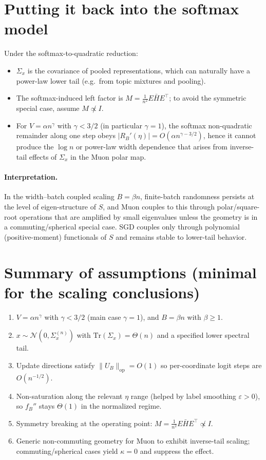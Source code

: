 \documentclass[11pt]{article}
\begin{document}
\section{Putting it back into the softmax model}

Under the softmax-to-quadratic reduction:
\begin{itemize}
\item $\Sigma_x$ is the covariance of pooled representations, which can naturally have a power-law lower tail (e.g.\ from topic mixtures and pooling).
\item The softmax-induced left factor is $M=\tfrac1{n^2}E\bar H E^\top$; to avoid the symmetric special case, assume $M\not\propto I$.
\item For $V=\alpha n^\gamma$ with $\gamma<3/2$ (in particular $\gamma=1$), the softmax non-quadratic remainder along one step obeys
$|R_B'(\eta)|=O(\alpha n^{\gamma-3/2})$, hence it cannot produce the $\log n$ or power-law width dependence that arises from inverse-tail
effects of $\Sigma_x$ in the Muon polar map.
\end{itemize}

\paragraph{Interpretation.}
In the width--batch coupled scaling $B=\beta n$, finite-batch randomness persists at the level of eigen-structure of $S$,
and Muon couples to this through polar/square-root operations that are amplified by small eigenvalues unless the geometry is in a commuting/spherical special case.
SGD couples only through polynomial (positive-moment) functionals of $S$ and remains stable to lower-tail behavior.

\section{Summary of assumptions (minimal for the scaling conclusions)}
\begin{enumerate}
\item $V=\alpha n^\gamma$ with $\gamma<3/2$ (main case $\gamma=1$), and $B=\beta n$ with $\beta\ge 1$.
\item $x\sim\mathcal N(0,\Sigma_x^{(n)})$ with $\mathrm{Tr}(\Sigma_x)=\Theta(n)$ and a specified lower spectral tail.
\item Update directions satisfy $\|U_B\|_{\mathrm{op}}=O(1)$ so per-coordinate logit steps are $O(n^{-1/2})$.
\item Non-saturation along the relevant $\eta$ range (helped by label smoothing $\varepsilon>0$), so $f_B''$ stays $\Theta(1)$ in the normalized regime.
\item Symmetry breaking at the operating point: $M=\tfrac1{n^2}E\bar H E^\top \not\propto I$.
\item Generic non-commuting geometry for Muon to exhibit inverse-tail scaling; commuting/spherical cases yield $\kappa=0$ and suppress the effect.
\end{enumerate}
\end{document}
